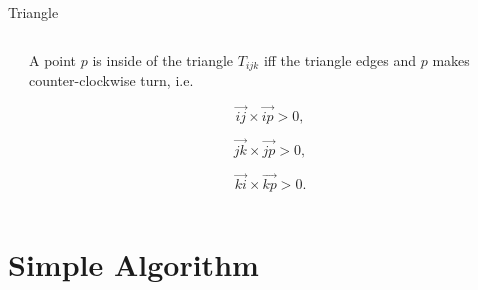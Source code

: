 \documentclass[10pt]{beamer}
\begin{document}
\begin{frame}{Triangle}
\begin{columns}
	\begin{column}{0.5\textwidth} 
	\end{column}
	\begin{column}{0.5\textwidth} 
		A point $p$ is inside of the triangle $T_{ijk}$ iff 
		the triangle edges and $p$ makes \alert{counter-clockwise turn}, i.e.
		
		$$
			\vec{ij}\times\vec{ip} > 0,
		$$
		
		$$
			\vec{jk}\times\vec{jp} > 0,
		$$
		
		$$
			\vec{ki}\times\vec{kp} > 0.
		$$			
	\end{column}
\end{columns}	
\end{frame}

\section{Simple Algorithm}
\end{document}
